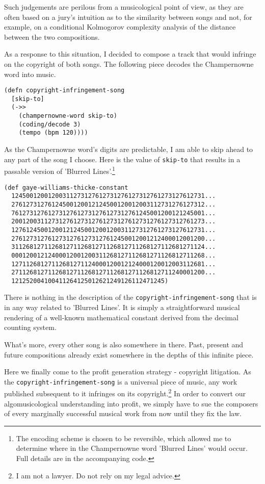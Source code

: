 \documentclass[numbers, preprint]{sigplanconf}
\begin{document}
Such judgements are perilous from a musicological point of view, as they are often based on a jury's intuition as to
the similarity between songs and not, for example, on a conditional Kolmogorov complexity analysis of the distance between
the two compositions.

As a response to this situation, I decided to compose a track that would infringe on the copyright of both songs. The following
piece decodes the Champernowne word into music.

\begin{verbatim}
(defn copyright-infringement-song
  [skip-to]
  (->>
    (champernowne-word skip-to)
    (coding/decode 3)
    (tempo (bpm 120))))
\end{verbatim}

As the Champernowne word's digits are predictable, I am able to skip ahead to any part of the song I choose. Here
is the value of \verb|skip-to| that results in a passable version of 'Blurred Lines'.\footnote{The encoding scheme is chosen
to be reversible, which allowed me to determine where in the Champernowne word 'Blurred Lines' would occur. Full details are in the accompanying code.}

\begin{verbatim}
(def gaye-williams-thicke-constant
  12450012001200311273127612731276127312761273127612731...
  27612731276124500120012124500120012003112731276127312...
  76127312761273127612731276127312761245001200121245001...
  20012003112731276127312761273127612731276127312761273...
  12761245001200121245001200120031127312761273127612731...
  27612731276127312761273127612450012001212400012001200...
  31126812711268127112681271126812711268127112681271124...
  00012001212400012001200311268127112681271126812711268...
  12711268127112681271124000120012124000120012003112681...
  27112681271126812711268127112681271126812711240001200...
  121252004100411264125012621249126112471245)
\end{verbatim}

There is nothing in the description of the \verb|copyright-infringement-song| that is in any way related to 'Blurred Lines'.
It is simply a straightforward musical rendering of a well-known mathematical constant derived from the decimal counting
system.

What's more, every other song is also somewhere in there. Past, present and future compositions already exist somewhere in
the depths of this infinite piece.

Here we finally come to the profit generation strategy - copyright litigation. As the \verb|copyright-infringement-song| is
a universal piece of music, any work published subsequent to it infringes on its copyright.\footnote{I am not a lawyer. Do not rely on my legal advice.} In order to convert our algomusicological understanding into profit, we simply have to sue the composers
of every marginally successful musical work from now until they fix the law.
\end{document}
